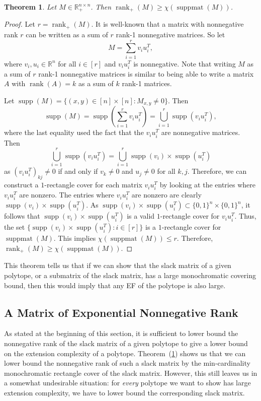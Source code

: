 \documentclass{article}
\newtheorem{theorem}{\sc Theorem}
\theoremstyle{definition}
\theoremstyle{remark}
\newcommand{\nrank}{\operatorname{rank}_+}
\newcommand{\rank}{\operatorname{rank}}
\newcommand{\bits}{\{0,1\}}
\newcommand{\suppmat}{\operatorname{suppmat}}
\newcommand{\supp}{\operatorname{supp}}
\renewcommand{\R}{\mathbb{R}}
\begin{document}
\begin{theorem}\label{theor:suppmat}
Let $M \in \R_+^{n \times n}$. Then $\rank_+(M) \ge \chi(\suppmat(M))$.
\end{theorem}
\begin{proof}
Let $r = \nrank(M)$. It is well-known that a matrix with nonnegative rank $r$ can be written as a sum of $r$ rank-1 nonnegative matrices. So let
\[
M = \sum_{i=1}^r v_iu_i^T,
\]
where $v_i, u_i \in \R^n$ for all $i \in [r]$ and $v_iu_i^T$ is nonnegative.
Note that writing $M$ as a sum of $r$ rank-1 nonnegative matrices is similar to being able to write a matrix $A$ with $\rank(A) = k$ as a sum of $k$ rank-1 matrices.

Let $\supp(M) = \{(x,y) \in [n] \times [n] : M_{x,y} \ne 0\}$. Then
\[
\supp(M) = \supp\left(\sum_{i=1}^r v_iu_i^T\right) = \bigcup_{i=1}^r \supp(v_iu_i^T), 
\]
where the last equality used the fact that the $v_iu_i^T$ are nonnegative matrices. Then 
\[
\bigcup_{i=1}^r \supp(v_iu_i^T) = \bigcup_{i=1}^r \supp(v_i) \times \supp(u_i^T) 
\]
as $(v_iu_i^T)_{kj} \ne 0$ if and only if $v_k \ne 0$ and $u_j \ne 0$ for all $k,j$. Therefore, we can construct a $1$-rectangle cover for each matrix $v_iu_i^T$ by looking at the entries where $v_iu_i^T$ are nonzero. The entries where $v_iu_i^T$ are nonzero are clearly $\supp(v_i) \times \supp(u_i^T)$. As $\supp(v_i) \times \supp(u_i^T) \subset \bits^n \times \bits^n$, it follows that $\supp(v_i) \times \supp(u_i^T)$ is a valid $1$-rectangle cover for $v_iu_i^T$. Thus, the set $\{\supp(v_i) \times \supp(u_i^T) : i \in [r]\}$ is a $1$-rectangle cover for $\suppmat(M)$. This implies $\chi(\suppmat(M)) \le r$. Therefore, $\nrank(M) \ge \chi(\suppmat(M))$.
\end{proof}

This theorem tells us that if we can show that the slack matrix of a given polytope, or a submatrix of the slack matrix, has a large monochromatic covering bound, then this would imply that any EF of the polytope is also large.


\subsection{A Matrix of Exponential Nonnegative Rank}\label{sec:rec-cover}

As stated at the beginning of this section, it is sufficient to lower bound the nonnegative rank of the slack matrix of a given polytope to give a lower bound on the extension complexity of a polytope. Theorem~(\ref{theor:suppmat}) shows us that we can lower bound the nonnegative rank of such a slack matrix by the min-cardinality monochromatic rectangle cover of the slack matrix. However, this still leaves us in a somewhat undesirable situation: for \emph{every} polytope we want to show has large extension complexity, we have to lower bound the corresponding slack matrix.
\end{document}
